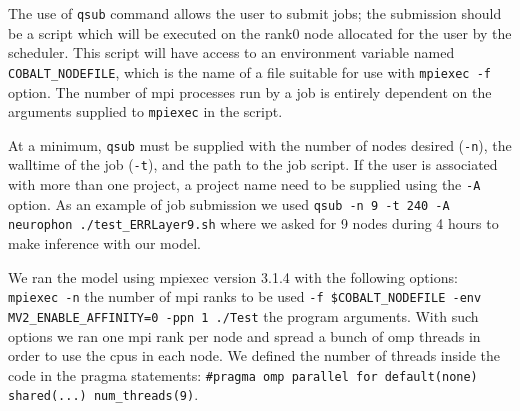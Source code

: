 {The use of \texttt{qsub} command allows the user to submit jobs; the submission should be a script which will be executed on the rank0 node allocated for the user by the scheduler. This script will have access to an environment variable named \texttt{COBALT\_NODEFILE}, which is the name of a file suitable for use with \texttt{mpiexec -f} option. The number of \gls{mpi} processes run by a job is entirely dependent on the arguments supplied to \texttt{mpiexec} in the script.

At a minimum, \texttt{qsub} must be supplied with the number of nodes desired (\texttt{-n}), the walltime of the job (\texttt{-t}), and the path to the job script.  If the user is associated with more than one project, a project name need to be supplied using the \texttt{-A} option. As an example of job submission we used \texttt{qsub -n 9 -t 240 -A neurophon ./test\_ERRLayer9.sh} where we asked for 9 nodes during 4 hours to make inference with our model.

We ran the model using mpiexec version 3.1.4 with the following options: \texttt{mpiexec -n} the number of \gls{mpi} ranks to be used \texttt{-f \$COBALT\_NODEFILE -env MV2\_ENABLE\_AFFINITY=0 -ppn 1 ./Test} the program arguments. With such options we ran one \gls{mpi} rank per node and spread a bunch of \gls{omp} threads in order to use the \glspl{cpu} in each node. We defined the number of threads inside the code in the pragma statements: \texttt{\#pragma omp parallel for default(none) shared(...) num\_threads(9)}.
}









